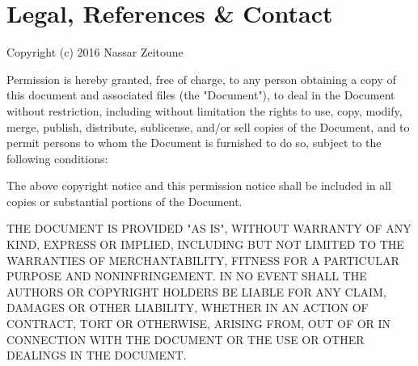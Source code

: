 \documentclass[10pt,twoside]{article}
\begin{document}
\newpage


\section{Legal, References \& Contact}

Copyright (c) 2016 Nassar Zeitoune

Permission is hereby granted, free of charge, to any person obtaining a copy of this document and associated files (the "Document"), to deal in the Document without restriction, including without limitation the rights to use, copy, modify, merge, publish, distribute, sublicense, and/or sell copies of the Document, and to permit persons to whom the Document is furnished to do so, subject to the following conditions:

The above copyright notice and this permission notice shall be included in all copies or substantial portions of the Document.

THE DOCUMENT IS PROVIDED "AS IS", WITHOUT WARRANTY OF ANY KIND, EXPRESS OR IMPLIED, INCLUDING BUT NOT LIMITED TO THE WARRANTIES OF MERCHANTABILITY, FITNESS FOR A PARTICULAR PURPOSE AND NONINFRINGEMENT. IN NO EVENT SHALL THE AUTHORS OR COPYRIGHT HOLDERS BE LIABLE FOR ANY CLAIM, DAMAGES OR OTHER LIABILITY, WHETHER IN AN ACTION OF CONTRACT, TORT OR OTHERWISE, ARISING FROM, OUT OF OR IN CONNECTION WITH THE DOCUMENT OR THE USE OR OTHER DEALINGS IN THE DOCUMENT.
\end{document}
